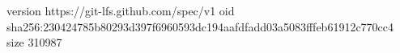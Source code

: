 version https://git-lfs.github.com/spec/v1
oid sha256:230424785b80293d397f6960593dc194aafdfadd03a5083fffeb61912c770cc4
size 310987
